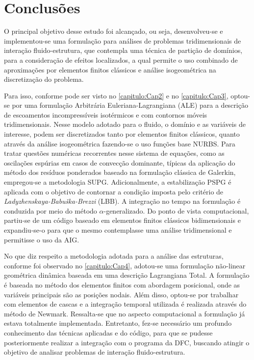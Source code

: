 \chapter{Conclusões} 

O principal objetivo desse estudo foi alcançado, ou seja, desenvolveu-se e implementou-se uma formulação
para análises de problemas tridimensionais de interação fluido-estrutura, que contempla uma técnica de 
partição de domínios, para a consideração de efeitos localizados, a qual permite o uso combinado de aproximações por elementos finitos clássicos
e análise isogeométrica na discretização do problema.

Para isso, conforme pode ser visto no \autoref{capitulo:Cap2} e no \autoref{capitulo:Cap3}, optou-se por uma formulação Arbitrária Euleriana-Lagrangiana (ALE) para a descrição de escoamentos incompressíveis isotérmicos e com contornos móveis tridimensionais. Nesse modelo adotado para o fluido, o domínio e as variáveis de interesse, podem ser discretizados tanto por elementos finitos clássicos, quanto através da análise isogeométrica fazendo-se o uso funções base NURBS. Para tratar questões numéricas recorrentes nesse sistema de equações, como as oscilações espúrias em casos de convecção dominante, típicas da aplicação do método dos resíduos ponderados baseado na formulação clássica de Galerkin, empregou-se a metodologia SUPG. Adicionalmente, a estabilização PSPG é aplicada com o objetivo de contornar a condição imposta pelo critério de \textit{Ladyzhenskaya-Babuška-Brezzi} (LBB). A integração no tempo na formulação é conduzida por meio do método $\alpha$-generalizado. Do ponto de vista computacional, partiu-se de um código baseado em elementos finitos clássicos bidimensionais e expandiu-se-o para que o mesmo contemplasse uma análise tridimensional e permitisse o uso da AIG.  

No que diz respeito a metodologia adotada para a análise das estruturas, conforme foi observado no \autoref{capitulo:Cap4}, adotou-se uma formulação não-linear geométrica dinâmica baseada em uma descrição Lagrangiana Total. A formulação é baseada no método dos elementos finitos com abordagem posicional, onde as variáveis principais são as posições nodais. Além disso, optou-se por trabalhar com elementos de cascas e a integração temporal utilizada é realizada através do método de Newmark. Ressalta-se que no aspecto computacional a formulação já estava totalmente implementada. Entretanto, fez-se necessário um profundo conhecimento das técnicas aplicadas e do código, para que se pudesse posteriormente realizar a integração com o programa da DFC, buscando atingir o objetivo de analisar problemas de interação fluido-estrutura.

